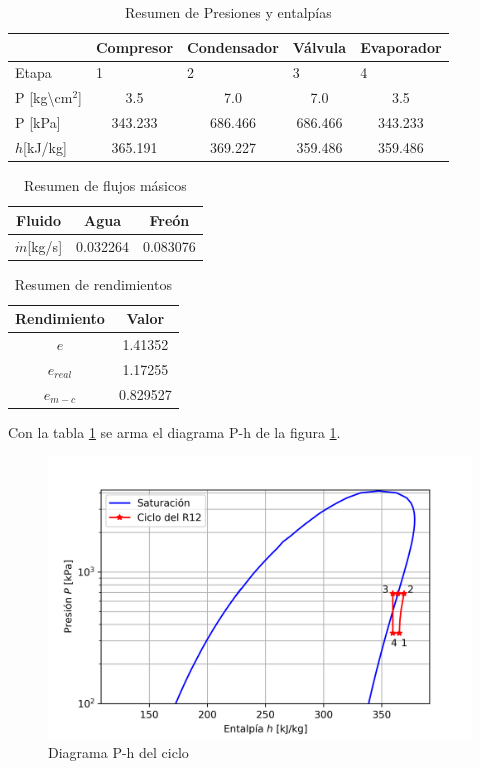 \documentclass[11pt,letterpaper]{extarticle}        %
\numberwithin{equation}{section}                    %
\begin{document}
\begin{table}[H]
\centering
\caption{Resumen de Presiones y entalpías}
\label{t:Compresor}
\begin{tabular}{|l|c|c|c|c|}
\hline
\multicolumn{1}{|l}{} & \multicolumn{1}{l}{Compresor} & \multicolumn{1}{l}{Condensador} & \multicolumn{1}{l}{Válvula} & \multicolumn{1}{l|}{Evaporador} \\
\hline
\multicolumn{1}{|l}{Etapa} & \multicolumn{1}{l}{1} & \multicolumn{1}{l}{2} & \multicolumn{1}{l}{3} & \multicolumn{1}{l|}{4} \\
P {[}kg\textbackslash{}cm$^2${]} & 3.5 & 7.0 & 7.0 & 3.5 \\
P {[}kPa{]} & 343.233 & 686.466 & 686.466 & 343.233 \\
$h${[}kJ/kg{]} & 365.191 & 369.227 & 359.486 & 359.486\\
\hline
\end{tabular}
\end{table}


\begin{table}[H]
\centering
\caption{Resumen de flujos másicos}
\label{t:masa}
\begin{tabular}{|c|c|c|}
\hline
Fluido              & Agua     & Freón    \\ \hline\hline
$\dot{m}${[}kg/s{]} & 0.032264 & 0.083076 \\ \hline
\end{tabular}
\end{table}

\begin{table}[H]
\centering
\caption{Resumen de rendimientos}
\label{t:Rendimientos}
\begin{tabular}{|c|c|}
\hline
Rendimiento & Valor    \\ \hline\hline
$e$         & 1.41352  \\ 
$e_{real}$  & 1.17255  \\ 
$e_{m-c}$   & 0.829527 \\ \hline
\end{tabular}
\end{table}

Con la tabla \ref{t:Compresor} se arma el diagrama P-h de la figura \ref{f:Ph}.

\begin{figure}[H]
\centering
\includegraphics[width=0.6\linewidth]{Anexo/Ph}
\caption{Diagrama P-h del ciclo}
\label{f:Ph}
\end{figure}
\end{document}
